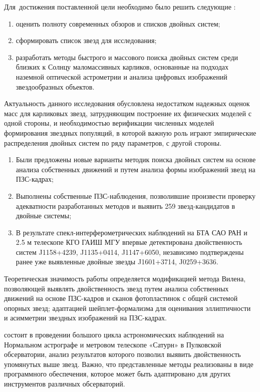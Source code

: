 Для~достижения поставленной цели необходимо было решить следующие {\tasks}:
\begin{enumerate}
  \item оценить полноту современных обзоров и списков двойных систем;
  \item сформировать список звезд для исследования;
  \item разработать методы быстрого и массового поиска двойных систем среди близких к Солнцу маломассивных карликов, основанные на подходах наземной оптической астрометрии и анализа цифровых изображений звездообразных объектов.
\end{enumerate}

Актуальность данного исследования обусловлена недостатком надежных оценок масс для карликовых звезд, затрудняющим построение их физических моделей с одной стороны, и необходимостью верификации численных моделей формирования звездных популяций, в которой важную роль играют эмпирические распределения двойных систем по ряду параметров, с другой стороны.

{\novelty}
\begin{enumerate}
  \item Были предложены новые варианты методик поиска двойных систем на основе анализа собственных движений и путем анализа формы изображений звезд на ПЗС-кадрах;
  \item Выполнены собственные ПЗС-наблюдения, позволившие произвести проверку адекватности разработанных методов и выявить 259 звезд-кандидатов в двойные системы;
  \item В результате спекл-интерферометрических наблюдений на БТА САО РАН и 2.5 м телескопе КГО ГАИШ МГУ впервые детектирована двойственность систем J1158+4239, J1135+0414, J1147+6050, независимо подтверждены ранее уже выявленные двойные звезды J1601+3714, J0259+3636.
\end{enumerate}

Теоретическая значимость работы определяется модификацией метода Вилена, позволяющей выявлять двойственность звезд путем анализа собственных движений на основе ПЗС-кадров и сканов фотопластинок с общей системой опорных звезд; адаптацией шейплет-формализма для оценивания эллиптичности и асимметрии звездных изображений на ПЗС-кадрах.

{\influence} состоит в проведении большого цикла астрономических наблюдений на Нормальном астрографе и метровом телескопе «Сатурн» в Пулковской обсерватории, анализ результатов которого позволил выявить двойственность упомянутых выше звезд. Важно, что представленные методы реализованы в виде программного обеспечения, которое может быть адаптировано для других инструментов различных обсерваторий.


